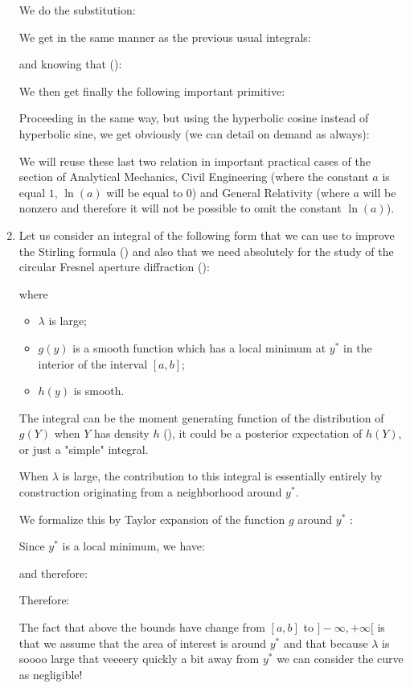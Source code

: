 \begin{enumerate}
		We do the substitution:
		
		We get in the same manner as the previous usual integrals:
		
		and knowing that ():
		
		We then get finally the following important primitive:
		
		Proceeding in the same way, but using the hyperbolic cosine instead of hyperbolic sine, we get obviously (we can detail on demand as always):
		
		We will reuse these last two relation in important practical cases of the section of Analytical Mechanics, Civil Engineering (where the constant $a$ is equal $1$, $\ln(a)$ will be equal to $0$) and General Relativity (where $a$ will be nonzero and therefore it will not be possible to omit the constant $\ln(a)$).
		
		\item Let us consider an integral of the following form that we can use to improve the Stirling formula () and also that we need absolutely for the study of the circular Fresnel aperture diffraction ():
		
		where
		\begin{itemize}
			\item $\lambda$ is large;
			\item $g(y)$ is a smooth function which has a local minimum at $y^*$ in the interior of the interval $[a, b]$;
			\item $h(y)$ is smooth.
		\end{itemize}
		The integral can be the moment generating function of the
		distribution of $g(Y)$ when $Y$ has density $h$ (), it could be a posterior expectation of $h(Y)$, or just a "simple" integral.
		
		When $\lambda$ is large, the contribution to this integral is essentially entirely by construction originating from a neighborhood around $y^*$.
		
		We formalize this by Taylor expansion of the function $g$ around $y^*$ :
		
		Since $y^*$ is a local minimum, we have:
		
		 and therefore:
		
		Therefore:
		
		The fact that above the bounds have change from $[a,b]$ to $]-\infty,+\infty[$ is that we assume that the area of interest is around $y^*$ and that because $\lambda$ is soooo large that veeeery quickly a bit away from $y^*$ we can consider the curve as negligible!
		

\end{enumerate}
